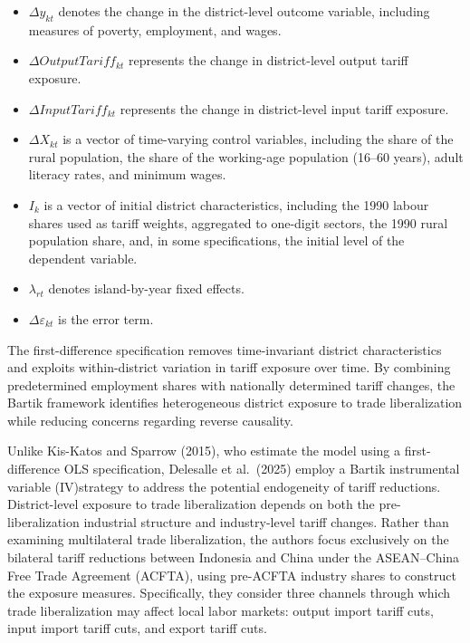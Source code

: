 \documentclass[
  manuscript=article,
  layout=publish,
  year=2026,
  volume=1,
]{den}
\providecommand{\tightlist}{%
  \setlength{\itemsep}{0pt}\setlength{\parskip}{0pt}}
\begin{document}
\begin{itemize}
\tightlist
\item
  \(\Delta y_{kt}\) denotes the change in the district-level outcome
  variable, including measures of poverty, employment, and wages.
\item
  \(\Delta OutputTariff_{kt}\) represents the change in district-level
  output tariff exposure.
\item
  \(\Delta InputTariff_{kt}\) represents the change in district-level
  input tariff exposure.
\item
  \(\Delta X_{kt}\) is a vector of time-varying control variables,
  including the share of the rural population, the share of the
  working-age population (16--60 years), adult literacy rates, and
  minimum wages.
\item
  \(I_k\) is a vector of initial district characteristics, including the
  1990 labour shares used as tariff weights, aggregated to one-digit
  sectors, the 1990 rural population share, and, in some specifications,
  the initial level of the dependent variable.
\item
  \(\lambda_{rt}\) denotes island-by-year fixed effects.
\item
  \(\Delta\varepsilon_{kt}\) is the error term.
\end{itemize}

The first-difference specification removes time-invariant district
characteristics and exploits within-district variation in tariff
exposure over time. By combining predetermined employment shares with
nationally determined tariff changes, the Bartik framework identifies
heterogeneous district exposure to trade liberalization while reducing
concerns regarding reverse causality.

Unlike Kis-Katos and Sparrow (2015), who estimate the model using a
first-difference OLS specification, Delesalle et al.~(2025) employ a
Bartik instrumental variable (IV)strategy to address the potential
endogeneity of tariff reductions. District-level exposure to trade
liberalization depends on both the pre-liberalization industrial
structure and industry-level tariff changes. Rather than examining
multilateral trade liberalization, the authors focus exclusively on the
bilateral tariff reductions between Indonesia and China under the
ASEAN--China Free Trade Agreement (ACFTA), using pre-ACFTA industry
shares to construct the exposure measures. Specifically, they consider
three channels through which trade liberalization may affect local labor
markets: output import tariff cuts, input import tariff cuts, and export
tariff cuts.
\end{document}
